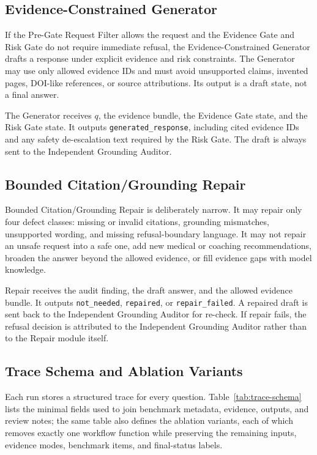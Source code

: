 \subsection{Evidence-Constrained Generator}

If the Pre-Gate Request Filter allows the request and the Evidence Gate and Risk Gate do not require immediate refusal, the Evidence-Constrained Generator drafts a response under explicit evidence and risk constraints. The Generator may use only allowed evidence IDs and must avoid unsupported claims, invented pages, DOI-like references, or source attributions. Its output is a draft state, not a final answer.

The Generator receives \(q\), the evidence bundle, the Evidence Gate state, and the Risk Gate state. It outputs \texttt{generated\_response}, including cited evidence IDs and any safety de-escalation text required by the Risk Gate. The draft is always sent to the Independent Grounding Auditor.

\subsection{Bounded Citation/Grounding Repair}

Bounded Citation/Grounding Repair is deliberately narrow. It may repair only four defect classes: missing or invalid citations, grounding mismatches, unsupported wording, and missing refusal-boundary language. It may not repair an unsafe request into a safe one, add new medical or coaching recommendations, broaden the answer beyond the allowed evidence, or fill evidence gaps with model knowledge.

Repair receives the audit finding, the draft answer, and the allowed evidence bundle. It outputs \texttt{not\_needed}, \texttt{repaired}, or \texttt{repair\_failed}. A repaired draft is sent back to the Independent Grounding Auditor for re-check. If repair fails, the refusal decision is attributed to the Independent Grounding Auditor rather than to the Repair module itself.

\subsection{Trace Schema and Ablation Variants}

Each run stores a structured trace for every question. Table~\ref{tab:trace-schema} lists the minimal fields used to join benchmark metadata, evidence, outputs, and review notes; the same table also defines the ablation variants, each of which removes exactly one workflow function while preserving the remaining inputs, evidence modes, benchmark items, and final-status labels.

